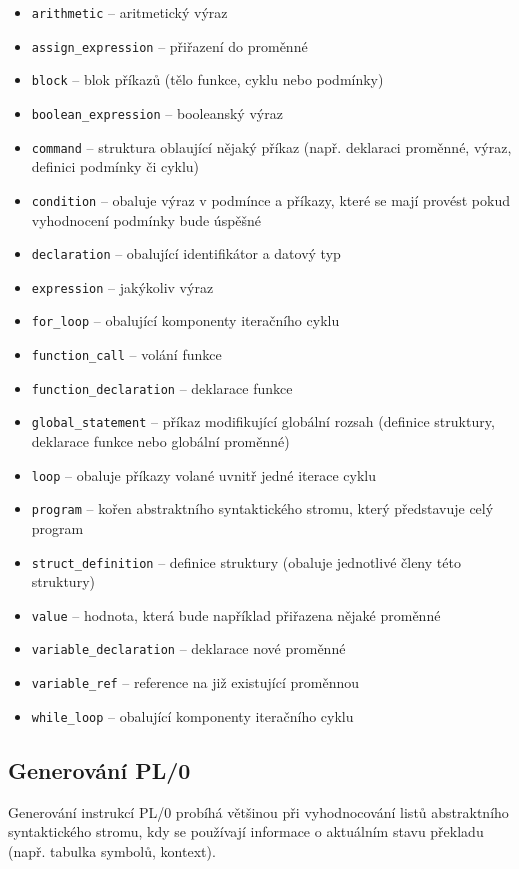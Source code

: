\documentclass[12pt, a4paper]{article}
\begin{document}
\begin{itemize}
    \item \texttt{arithmetic} -- aritmetický výraz
    \item \texttt{assign\_expression} -- přiřazení do proměnné
    \item \texttt{block} -- blok příkazů (tělo funkce, cyklu nebo podmínky)
    \item \texttt{boolean\_expression} -- booleanský výraz
    \item \texttt{command} -- struktura oblaující nějaký příkaz (např. deklaraci proměnné, výraz, definici podmínky či cyklu)
    \item \texttt{condition} -- obaluje výraz v podmínce a příkazy, které se mají provést pokud vyhodnocení podmínky bude úspěšné
    \item \texttt{declaration} -- obalující identifikátor a datový typ
    \item \texttt{expression} -- jakýkoliv výraz
    \item \texttt{for\_loop} -- obalující komponenty iteračního cyklu
    \item \texttt{function\_call} -- volání funkce
    \item \texttt{function\_declaration} -- deklarace funkce
    \item \texttt{global\_statement} -- příkaz modifikující globální rozsah (definice struktury, deklarace funkce nebo globální proměnné)
    \item \texttt{loop} -- obaluje příkazy volané uvnitř jedné iterace cyklu
    \item \texttt{program} -- kořen abstraktního syntaktického stromu, který představuje celý program
    \item \texttt{struct\_definition} -- definice struktury (obaluje jednotlivé členy této struktury)
    \item \texttt{value} -- hodnota, která bude například přiřazena nějaké proměnné
    \item \texttt{variable\_declaration} -- deklarace nové proměnné
    \item \texttt{variable\_ref} -- reference na již existující proměnnou
    \item \texttt{while\_loop} -- obalující komponenty iteračního cyklu
\end{itemize}


\subsection{Generování PL/0}
Generování instrukcí PL/0 probíhá většinou při vyhodnocování listů abstraktního syntaktického stromu, kdy se používají informace o aktuálním stavu překladu (např. tabulka symbolů, kontext). 
\end{document}
